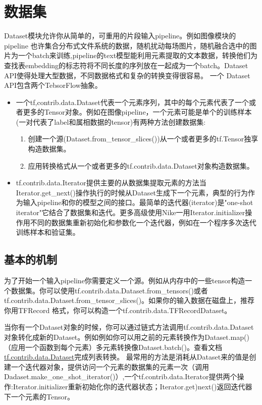 \section{数据集}
Dataset模块允许你从简单的，可重用的片段输入pipeline。例如图像模块的pipeline
也许集合分布式文件系统的数据，随机扰动每场图片，随机融合选中的图片为一个batch来训练,pipeline的text模型能利用元素提取的文本数据，转换他们为查找表embedding的标志符将不同长度的序列放在一起成为一个batch。Dataset API使得处理大型数据，不同数据格式和复杂的转换变得很容易。
一个 Dataset
 API包含两个TebsorFlow抽象。
\begin{itemize}
\item 一个tf,contrib.data.Dataset代表一个元素序列，其中的每个元素代表了一个或者更多的Tensor对象。例如在图像pipeline，一个元素可能是单个的训练样本(一对代表了label和属相数据的tensor)有两种方法创建数据集:
	\begin{enumerate}
		\item 创建一个源(Dataset.from\_tensor\_slices())从一个或者更多的tf.Tensor独享构造数据集。
		\item 应用转换格式从一个或者更多的tf.contrib.data.Dataset对象构造数据集。
	\end{enumerate}
	\item tf.contrib.data.Iterator提供主要的从数据集提取元素的方法当Iterator.get\_next()操作执行的时候从Dataset生成下一个元素，典型的行为作为输入pipeline和你的模型之间的接口。最简单的迭代器(iterator)是"one-shot iterator"它结合了数据集和迭代。更多高级使用Nike一用Iterator.initializer操作用不同的数据集重新初始化和参数化一个迭代器，例如在一个程序多次迭代训练样本和验证集。
\end{itemize}
\subsection{基本的机制}
为了开始一个输入pipeline你需要定义一个源。例如从内存中的一些tensor构造一个数据集。你可以使用tf.contrib.data.Dataset.from\_tensors()或者tf.contrib.data.Dataset.from\_tensor\_slices()。如果你的输入数据在磁盘上，推荐你用TFRecord
格式，你可以构造一个tf.contrib.data.TFRecordDataset。

当你有一个Dataset对象的时候，你可以通过链式方法调用tf.contrib.data.Dataset对象转化成新的Dataset。例如例如你可以用之前的元素转换作为Dataset.map()（应用一个函数到每个元素）多元素转换像Dataset.batch()。查看文档\href{https://www.tensorflow.org/api_docs/python/tf/contrib/data/Dataset}{tf.contrib.data.Dataset}完成列表转换。
最常用的方法是消耗从Dataset来的值是创建一个迭代器对象，提供访问一个元素的数据集的元素一次（调用Dadaset.make\_one\_shot\_iterator()）,一个tf.contrib.data.Iterator提供两个操作:Iterator.initializer重新初始化你的迭代器状态；Iterator.get)next()返回迭代器下一个元素的Tensor。
